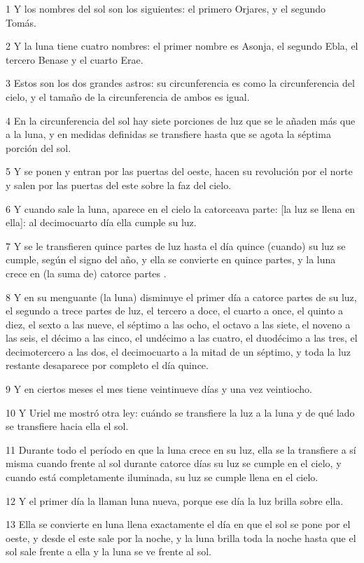 \par 1 Y los nombres del sol son los siguientes: el primero Orjares, y el segundo Tomás.
\par 2 Y la luna tiene cuatro nombres: el primer nombre es Asonja, el segundo Ebla, el tercero Benase y el cuarto Erae.
\par 3 Estos son los dos grandes astros: su circunferencia es como la circunferencia del cielo, y el tamaño de la circunferencia de ambos es igual.
\par 4 En la circunferencia del sol hay siete porciones de luz que se le añaden más que a la luna, y en medidas definidas se transfiere hasta que se agota la séptima porción del sol.
\par 5 Y se ponen y entran por las puertas del oeste, hacen su revolución por el norte y salen por las puertas del este sobre la faz del cielo.
\par 6 Y cuando sale la luna, aparece en el cielo la catorceava parte: [la luz se llena en ella]: al decimocuarto día ella cumple su luz.
\par 7 Y se le transfieren quince partes de luz hasta el día quince (cuando) su luz se cumple, según el signo del año, y ella se convierte en quince partes, y la luna crece en (la suma de) catorce partes .
\par 8 Y en su menguante (la luna) disminuye el primer día a catorce partes de su luz, el segundo a trece partes de luz, el tercero a doce, el cuarto a once, el quinto a diez, el sexto a las nueve, el séptimo a las ocho, el octavo a las siete, el noveno a las seis, el décimo a las cinco, el undécimo a las cuatro, el duodécimo a las tres, el decimotercero a las dos, el decimocuarto a la mitad de un séptimo, y toda la luz restante desaparece por completo el día quince.
\par 9 Y en ciertos meses el mes tiene veintinueve días y una vez veintiocho.
\par 10 Y Uriel me mostró otra ley: cuándo se transfiere la luz a la luna y de qué lado se transfiere hacia ella el sol.
\par 11 Durante todo el período en que la luna crece en su luz, ella se la transfiere a sí misma cuando frente al sol durante catorce días su luz se cumple en el cielo, y cuando está completamente iluminada, su luz se cumple llena en el cielo.
\par 12 Y el primer día la llaman luna nueva, porque ese día la luz brilla sobre ella.
\par 13 Ella se convierte en luna llena exactamente el día en que el sol se pone por el oeste, y desde el este sale por la noche, y la luna brilla toda la noche hasta que el sol sale frente a ella y la luna se ve frente al sol.
